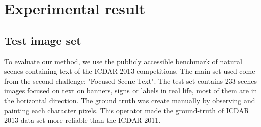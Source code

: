 
\graphicspath{ {6chapterExperimental/image/} }
\chapter{Experimental result}
\section{Test image set}
To evaluate our method, we use the publicly accessible benchmark of natural scenes containing text of the ICDAR 2013 competitions. The main set used come from the second challenge: "Focused Scene Text". The test set contains 233 scenes images focused on text on banners, signs or labels in real life, most of them are in the horizontal direction. The ground truth was create manually by observing and painting each character pixels. This operator made the ground-truth of ICDAR 2013 data set more reliable than the ICDAR 2011.   
 
